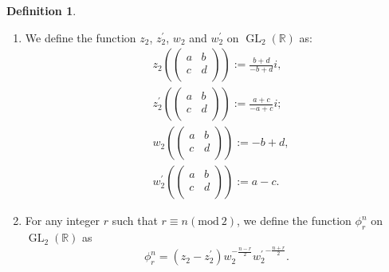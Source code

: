 \documentclass[11pt, a4paper]{amsart}
\theoremstyle{plain}
\theoremstyle{definition}
\newtheorem{definition}[theorem]{Definition}
\numberwithin{equation}{section}
\def\RR{\mathbb{R}}
\DeclareMathOperator{\GL}{\mathrm{GL}}
\begin{document}
\begin{definition}
\label{def: function phi}
    \begin{enumerate}
        \item We define the function $z_{2}$, $z_{2}^{\prime}$, $w_{2}$ and $w_{2}^{\prime}$ on $\GL_{2}(\RR)$ as: 
            \begin{align*}
                & z_{2}(\begin{pmatrix}
                    a & b \\
                    c & d \\
                \end{pmatrix}) := \frac{b + d}{-b + d}i,  \\ & z_{2}^{\prime}(\begin{pmatrix}
                                                                            a & b \\
                                                                            c & d \\
                                                                        \end{pmatrix}) := \frac{a + c}{-a + c}i; \\
                & w_{2}(\begin{pmatrix}
                            a & b \\
                            c & d \\
                        \end{pmatrix}) :=-b + d, \\ &      w_{2}^{\prime}(\begin{pmatrix}
                                                                            a & b \\
                                                                            c & d \\
                                                                        \end{pmatrix}) := a - c. 
            \end{align*}
        \item For any integer $r$ such that $r \equiv n (\text{mod} \ 2)$, we define the function $\phi_{r}^{n}$ on $\GL_2(\RR)$ as 
                \begin{equation*}
                    \phi_{r}^{n} = (z_2 - z_2^{\prime}) w_{2}^{-\frac{n - r}{2}} {w_{2}^{\prime}}^{-\frac{n + r}{2}}. 
                \end{equation*}
    \end{enumerate}
\end{definition}
\end{document}
